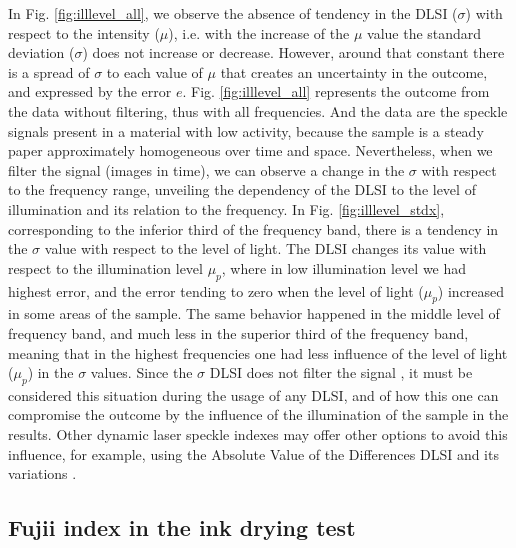\documentclass[review]{elsarticle}
\begin{document}
In Fig. \ref{fig:illlevel_all}, we observe the absence of tendency in the DLSI ($\sigma$) with respect to the intensity ($\mu$), i.e. with the increase of the $\mu$ value the standard deviation ($\sigma$) does not increase or decrease. 
However, around that constant there is a spread of $\sigma$ to each value of $\mu$ that creates an uncertainty in the outcome, and expressed by the error $e$. 
Fig. \ref{fig:illlevel_all} represents the outcome from the data without filtering, thus with all frequencies. 
And the data are the speckle signals present in a material with low activity, because the sample is a steady paper approximately homogeneous over time and space.
Nevertheless, when we filter the signal (images in time), 
we can observe a change in the $\sigma$ with respect to the frequency range, 
unveiling the dependency of the DLSI to the level of illumination and its relation to the frequency.
In Fig. \ref{fig:illlevel_stdx}, corresponding to the inferior third of the frequency band, 
there is a tendency in the $\sigma$ value with respect to the level of light. 
The DLSI changes its value with respect to the illumination level $\mu_p$, 
where in low illumination level we had highest error, 
and the error tending to zero when the level of light ($\mu_p$) increased in some areas of the sample. 
The same behavior happened in the middle level of frequency band, 
and much less in the superior third of the frequency band, 
meaning that in the highest frequencies one had less influence of the level of light ($\mu_p$) in the $\sigma$ values. 
Since the $\sigma$ DLSI does not filter the signal \cite{RIVERA2017144}, 
it must be considered this situation during the usage of any DLSI, 
and of how this one can compromise the outcome by the influence of the illumination of the sample in the results.
Other dynamic laser speckle indexes may offer other options to avoid this influence,
for example, using the Absolute Value of the Differences DLSI and its variations \cite{BSLTLBOOK}.

\subsection{Fujii index in the ink drying test} 
\label{subsec:vsfujii}
\end{document}
